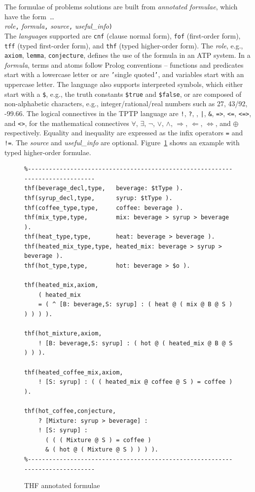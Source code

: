 \documentclass{easychair}
\newcommand{\smalltt}[1]{\small \texttt{#1}}
\begin{document}
The formulae of problems solutions are built from {\em annotated formulae}, 
which have the form~\ldots \\
{\em role}{\tt ,}
{\em formula}{\tt ,}
{\em source}{\tt ,}
{\em useful\_info}{\tt )}\\
The {\em language}s supported are {\smalltt{cnf}} (clause normal form), {\smalltt{fof}}
(first-order form), {\smalltt{tff}} (typed first-order form), and {\smalltt{thf}}
(typed higher-order form).
The {\em role}, e.g., {\smalltt{axiom}}, {\smalltt{lemma}}, {\smalltt{conjecture}}, defines the 
use of the formula in an ATP system.
In a {\em formula}, terms and atoms follow Prolog conventions -- functions and predicates start 
with a lowercase letter or are {\tt '}single quoted{\tt '}, and variables start with an uppercase 
letter.
The language also supports interpreted symbols, which either start with a {\tt \$}, e.g., the 
truth constants {\smalltt{\$true}} and {\smalltt{\$false}}, or are composed of 
non-alphabetic characters, e.g., integer/rational/real numbers such as 27, 43/92, -99.66.
The logical connectives in the TPTP language are
{\tt !}, {\tt ?}, {\tt {\raisebox{0.4ex}{\texttildelow}}}, {\tt |}, {\tt \&}, {\tt =>}, {\tt <=},
{\tt <=>}, and {\tt <{\raisebox{0.4ex}{\texttildelow}}>},
for the mathematical connectives
$\forall$, $\exists$, $\neg$, $\vee$, $\wedge$, $\Rightarrow$, $\Leftarrow$, $\Leftrightarrow$, 
and $\oplus$ respectively.
Equality and inequality are expressed as the infix operators {\tt =} and {\tt !=}.
The {\em source} and {\em useful\_info} are optional.
Figure~\ref{ExampleFormulae} shows an example with typed higher-order formulae.

\begin{figure}[htb]
{\footnotesize
{\setlength{\baselineskip}{3mm}
\begin{verbatim}
%------------------------------------------------------------------------------
thf(beverage_decl,type,   beverage: $tType ).
thf(syrup_decl,type,      syrup: $tType ).
thf(coffee_type,type,     coffee: beverage ).
thf(mix_type,type,        mix: beverage > syrup > beverage ).
thf(heat_type,type,       heat: beverage > beverage ).
thf(heated_mix_type,type, heated_mix: beverage > syrup > beverage ).
thf(hot_type,type,        hot: beverage > $o ).

thf(heated_mix,axiom,
    ( heated_mix
    = ( ^ [B: beverage,S: syrup] : ( heat @ ( mix @ B @ S ) ) ) ) ).

thf(hot_mixture,axiom,
    ! [B: beverage,S: syrup] : ( hot @ ( heated_mix @ B @ S ) ) ).

thf(heated_coffee_mix,axiom,
    ! [S: syrup] : ( ( heated_mix @ coffee @ S ) = coffee ) ).

thf(hot_coffee,conjecture,
    ? [Mixture: syrup > beverage] :
    ! [S: syrup] :
      ( ( ( Mixture @ S ) = coffee )
      & ( hot @ ( Mixture @ S ) ) ) ).
%------------------------------------------------------------------------------
\end{verbatim}
}}
\caption{THF annotated formulae}
\label{ExampleFormulae}
\end{figure}
\end{document}
